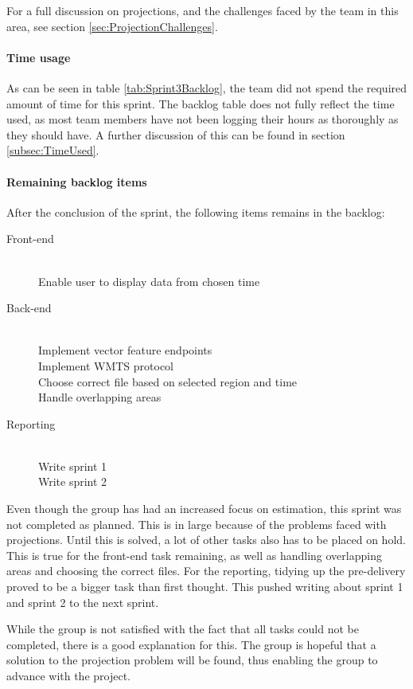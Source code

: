 \documentclass[11pt,a4paper,titlepage,oneside]{report}
\begin{document}
For a full discussion on projections, and the challenges faced by the team in this area, see section \ref{sec:ProjectionChallenges}. 

\paragraph{Time usage}
As can be seen in table \ref{tab:Sprint3Backlog}, the team did not spend the required amount of time for this sprint. The backlog table does not fully reflect the time used, as most team members have not been logging their hours as thoroughly as they should have. A further discussion of this can be found in section \ref{subsec:TimeUsed}.

\paragraph{Remaining backlog items}
After the conclusion of the sprint, the following items remains in the backlog:
\begin{description}
	\item[Front-end] \hfill \\
	Enable user to display data from chosen time
	\item[Back-end] \hfill \\
	Implement vector feature endpoints \hfill \\
	Implement \gls{WMTS} \gls{protocol} \hfill \\
	Choose correct file based on selected region and time \hfill \\
	Handle overlapping areas 
	\item[Reporting] \hfill \\
	Write sprint 1 \hfill \\
	Write sprint 2
\end{description}

Even though the group has had an increased focus on estimation, this sprint was not completed as planned. This is in large because of the problems faced with projections. Until this is solved, a lot of other tasks also has to be placed on hold. This is true for the \gls{front-end} task remaining, as well as handling overlapping areas and choosing the correct files. For the reporting, tidying up the \gls{pre-delivery} proved to be a bigger task than first thought. This pushed writing about sprint 1 and sprint 2 to the next sprint.  

While the group is not satisfied with the fact that all tasks could not be completed, there is a good explanation for this. The group is hopeful that a solution to the projection problem will be found, thus enabling the group to advance with the project. 
\end{document}
